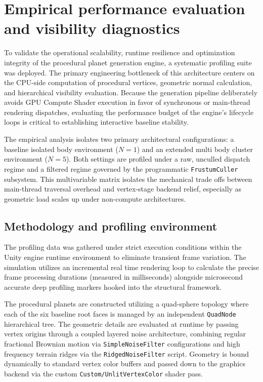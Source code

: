 \documentclass[12pt]{report}
\begin{document}
\chapter{Empirical performance evaluation and visibility diagnostics}
\label{ch:performance_evaluation}

To validate the operational scalability, runtime resilience and optimization integrity of the procedural planet generation engine, a systematic profiling suite was deployed. The primary engineering bottleneck of this architecture centers on the CPU-side computation of procedural vertices, geometric normal calculation, and hierarchical visibility evaluation. Because the generation pipeline deliberately avoids GPU Compute Shader execution in favor of synchronous or main-thread rendering dispatches, evaluating the performance budget of the engine's lifecycle loops is critical to establishing interactive baseline stability.

The empirical analysis isolates two primary architectural configurations: a baseline isolated body environment ($N=1$) and an extended multi body cluster environment ($N=5$). Both settings are profiled under a raw, unculled dispatch regime and a filtered regime governed by the programmatic \texttt{FrustumCuller} subsystem. This multivariable matrix isolates the mechanical trade offs between main-thread traversal overhead and vertex-stage backend relief, especially as geometric load scales up under non-compute architectures.

\section{Methodology and profiling environment}
The profiling data was gathered under strict execution conditions within the Unity engine runtime environment to eliminate transient frame variation. The simulation utilizes an incremental real time rendering loop to calculate the precise frame processing durations (measured in milliseconds) alongside microsecond accurate deep profiling markers hooked into the structural framework. 

The procedural planets are constructed utilizing a quad-sphere topology where each of the six baseline root faces is managed by an independent \texttt{QuadNode} hierarchical tree. The geometric details are evaluated at runtime by passing vertex origins through a coupled layered noise architecture, combining regular fractional Brownian motion via \texttt{SimpleNoiseFilter} configurations and high frequency terrain ridges via the \texttt{RidgedNoiseFilter} script. Geometry is bound dynamically to standard vertex color buffers and passed down to the graphics backend via the custom \texttt{Custom/UnlitVertexColor} shader pass.
\end{document}
